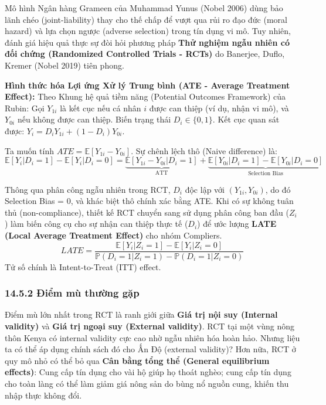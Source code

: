 \documentclass[
]{article}
\begin{document}
Mô hình Ngân hàng Grameen của Muhammad Yunus (Nobel 2006) dùng bảo lãnh
chéo (joint-liability) thay cho thế chấp để vượt qua rủi ro đạo đức
(moral hazard) và lựa chọn ngược (adverse selection) trong tín dụng vi
mô. Tuy nhiên, đánh giá hiệu quả thực sự đòi hỏi phương pháp \textbf{Thử
nghiệm ngẫu nhiên có đối chứng (Randomized Controlled Trials - RCTs)} do
Banerjee, Duflo, Kremer (Nobel 2019) tiên phong.

\textbf{Hình thức hóa Lợi ứng Xử lý Trung bình (ATE - Average Treatment
Effect):} Theo Khung hệ quả tiềm năng (Potential Outcomes Framework) của
Rubin: Gọi \(Y_{1i}\) là kết cục nếu cá nhân \(i\) được can thiệp (ví
dụ, nhận vi mô), và \(Y_{0i}\) nếu không được can thiệp. Biến trạng thái
\(D_i \in \{0,1\}\). Kết cục quan sát được:
\(Y_i = D_i Y_{1i} + (1 - D_i) Y_{0i}\).

Ta muốn tính \(ATE = \mathbb{E}[Y_{1i} - Y_{0i}]\). Sự chênh lệch thô
(Naive difference) là:
\[ \mathbb{E}[Y_i | D_i = 1] - \mathbb{E}[Y_i | D_i = 0] = \underbrace{\mathbb{E}[Y_{1i} - Y_{0i} | D_i = 1]}_{\text{ATT}} + \underbrace{\mathbb{E}[Y_{0i} | D_i = 1] - \mathbb{E}[Y_{0i} | D_i = 0]}_{\text{Selection Bias}} \]

Thông qua phân công ngẫu nhiên trong RCT, \(D_i\) độc lập với
\((Y_{1i}, Y_{0i})\), do đó Selection Bias = 0, và khác biệt thô chính
xác bằng ATE. Khi có sự không tuân thủ (non-compliance), thiết kế RCT
chuyển sang sử dụng phân công ban đầu (\(Z_i\)) làm biến công cụ cho sự
nhận can thiệp thực tế (\(D_i\)) để ước lượng \textbf{LATE (Local
Average Treatment Effect)} cho nhóm Compliers.
\[ LATE = \frac{\mathbb{E}[Y_i | Z_i = 1] - \mathbb{E}[Y_i | Z_i = 0]}{\mathbb{P}(D_i = 1 | Z_i = 1) - \mathbb{P}(D_i = 1 | Z_i = 0)} \]
Tử số chính là Intent-to-Treat (ITT) effect.

\subsubsection{14.5.2 Điểm mù thường
gặp}\label{ux111iux1ec3m-muxf9-thux1b0ux1eddng-gux1eb7p-10}

Điểm mù lớn nhất trong RCT là ranh giới giữa \textbf{Giá trị nội suy
(Internal validity)} và \textbf{Giá trị ngoại suy (External validity)}.
RCT tại một vùng nông thôn Kenya có internal validity cực cao nhờ ngẫu
nhiên hóa hoàn hảo. Nhưng liệu ta có thể áp dụng chính sách đó cho Ấn Độ
(external validity)? Hơn nữa, RCT ở quy mô nhỏ có thể bỏ qua \textbf{Cân
bằng tổng thể (General equilibrium effects)}: Cung cấp tín dụng cho vài
hộ giúp họ thoát nghèo; cung cấp tín dụng cho toàn làng có thể làm giảm
giá nông sản do bùng nổ nguồn cung, khiến thu nhập thực không đổi.
\end{document}
